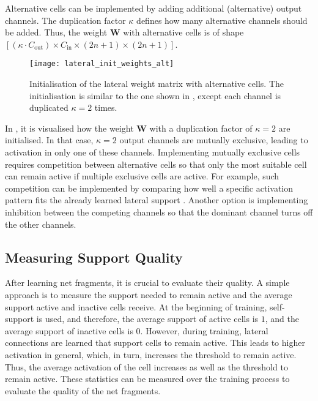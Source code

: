 Alternative cells can be implemented by adding additional (alternative) output channels.
The duplication factor $\kappa$ defines how many alternative channels should be added.
Thus, the weight $\boldsymbol{W}$ with alternative cells is of shape $\left[(\kappa \cdot C_{\text{out}}) \times C_{\text{in}} \times (2n+1) \times (2n+1)\right]$.

\begin{figure}[h]
    \centering
    \texttt{[image: lateral\_init\_weights\_alt]}
    \caption[Initialisation of the lateral weight matrix with alternative cells]{Initialisation of the lateral weight matrix with alternative cells. The initialisation is similar to the one shown in , except each channel is duplicated $\kappa=2$ times.}
\end{figure}

In , it is visualised how the weight $\boldsymbol{W}$ with a duplication factor of $\kappa=2$ are initialised.
In that case, $\kappa=2$ output channels are mutually exclusive, leading to activation in only one of these channels.
Implementing mutually exclusive cells requires competition between alternative cells  so that only the most suitable cell can remain active if multiple exclusive cells are active.
For example, such competition can be implemented by comparing how well a specific activation pattern fits the already learned lateral support \cite{vogels_inhibitory_2011, joshi_rules_2009, teichmann_intrinsic_2015}.
Another option is implementing inhibition between the competing channels so that the dominant channel turns off the other channels.


\subsection{Measuring Support Quality}
After learning net fragments, it is crucial to evaluate their quality.
A simple approach is to measure the support needed to remain active and the average support active and inactive cells receive.
At the beginning of training, self-support is used, and therefore, the average support of active cells is $1$, and the average support of inactive cells is $0$.
However, during training, lateral connections are learned that support cells to remain active.
This leads to higher activation in general, which, in turn, increases the threshold to remain active.
Thus, the average activation of the cell increases as well as the threshold to remain active.
These statistics can be measured over the training process to evaluate the quality of the net fragments.

